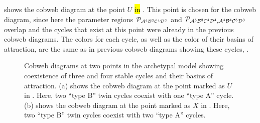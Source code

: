 shows the cobweb diagram at the point $U$ \hl{in} .
This point is chosen for the cobweb diagram, since here the parameter regions $\mathcal{P}_{\mathcal{A}^4\mathcal{B}^3\mathcal{C}^4\mathcal{D}^3}$ and $\mathcal{P}_{\mathcal{A}^5\mathcal{B}^3\mathcal{C}^4\mathcal{D}^4, \mathcal{A}^4\mathcal{B}^4\mathcal{C}^5\mathcal{D}^3}$ overlap and the cycles that exist at this point were already in the previous cobweb diagrams.
The colors for each cycle, as well as the color of their basins of attraction, are the same as in previous cobweb diagrams showing these cycles, .

\begin{figure}
	\centering
	\caption[Cobweb diagrams of the archetypal model showing coexistence of up to four cycles]{
		Cobweb diagrams at two points in the archetypal model showing coexistence of three and four stable cycles and their basins of attraction.
		(a) shows the cobweb diagram at the point marked as $U$ in .
		Here, two ``type B'' twin cycles coexist with one ``type A'' cycle.
		(b) shows the cobweb diagram at the point marked as $X$ in .
		Here, two ``type B'' twin cycles coexist with two ``type A'' cycles.
	}
\end{figure}

